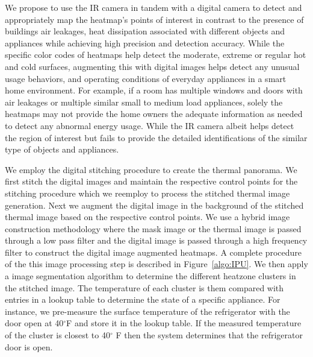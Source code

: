 We propose to use the IR camera in tandem with a digital camera to detect and appropriately map the heatmap's points of interest in contrast to the presence of buildings air leakages, heat dissipation associated with different objects and appliances while achieving high precision and detection accuracy. While the specific color codes of heatmaps help detect the moderate, extreme or regular hot and cold surfaces, augmenting this with digital images helps detect any unusual usage behaviors, and operating conditions of everyday appliances in a smart home environment. For example, if a room has multiple windows and doors with air leakages or multiple similar small to medium load appliances, solely the heatmaps may not provide the home owners the adequate information as needed to detect any abnormal energy usage. While the IR camera albeit helps detect the region of interest but fails to provide the detailed identifications of the similar type of objects and appliances.


We employ the digital stitching procedure to create the thermal panorama. We first stitch the digital images and maintain the respective control points for the stitching procedure which we reemploy to process the stitched thermal image generation. Next we augment the digital image in the background of the stitched thermal image based on the respective control points.%
 We use a hybrid image construction methodology where the mask image or the thermal image is passed through a low pass filter and the digital image is passed through a high frequency filter to construct the digital image augmented heatmaps. A complete procedure of the this image processing step is described in Figure~\ref{algo:IPU}. We then apply a image segmentation algorithm to determine the different heatzone clusters in the stitched image. The temperature of each cluster is them compared with entries in a lookup table to determine the state of a specific appliance. For instance, we pre-measure the surface temperature of the refrigerator with the door open at 40$^{\circ}$F  and store it in the lookup table. If the measured temperature of the cluster is closest to 40$^{\circ}$ F then the system determines that the refrigerator door is open.

